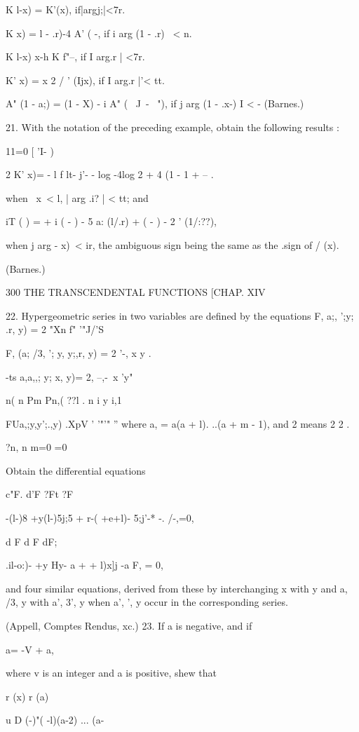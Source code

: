 K l-x) = K'(x), if|argj;|<7r.

K x) = l - .r)-4 A' ( -, if i arg (1 - .r) \ < n.

K l-x) x-h K f"--, if I arg.r | <7r.

K' x) = x 2 / ' (Ijx), if I arg.r |'< tt.

A" (1 - a;) = (1 - X) - i A" ( \ J\ - \ "), if j arg (1 - .x-) I < -
(Barnes.)

21. With the notation of the preceding example, obtain the following
results :

11=0 [ 'I- )

2 K' x)= - l f lt- j'- - log -4log 2 + 4 (1 - 1 + -- .

when \ x\ < l, | arg .i? | < tt; and

iT ( ) = + i ( - ) - 5 a: (l/.r) + ( - ) - 2 ' (1/:??),

when j arg - x)\ < ir, the ambiguous sign being the same as the .sign
of / (x).

(Barnes.)

300 THE TRANSCENDENTAL FUNCTIONS [CHAP. XIV

22. Hypergeometric series in two variables are defined by the
equations F, a;, ';y; .r, y) = 2 "Xn f" '"J/'S

F, (a; /3, '; y, y;,r, y) = 2 '-, x y .

-ts a,a,,; y; x, y)= 2, --,-\ x 'y"

 n( n Pm Pn,( ??l . n i y i,1

FUa,;y,y';.,y) .XpV ' '"'" '' where a, = a(a + l). ..(a + m - 1), and
2 means 2 2 .

?n, n m=0 =0

Obtain the differential equations

c"F. d'F ?Ft ?F

-(l-)8 +y(l-)5j;5 + r-( +e+l)- 5;j'-* -. /-,=0,

d F d F dF;

.il-o:)- +y Hy- a + + l)x]j -a F, = 0,

and four similar equations, derived from these by interchanging x with
y and a, /3, y with a', 3', y when a', ', y occur in the corresponding
series.

(Appell, Comptes Rendus, xc.) 23. If a is negative, and if

a= -V + a,

where v is an integer and a is positive, shew that

r (x) r (a)

u D (-)"( -l)(a-2) ... (a-%

